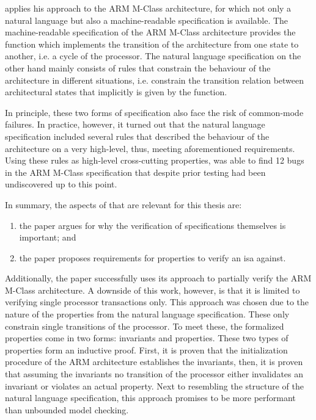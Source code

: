 \citeauthor{Reid17} applies his approach to the ARM M-Class architecture, for which not only a natural language but also a machine-readable specification is available.
The machine-readable specification of the ARM M-Class architecture provides the function  which implements the transition of the architecture from one state to another, i.e. a cycle of the processor.
The natural language specification on the other hand mainly consists of rules that constrain the behaviour of the architecture in different situations, i.e. constrain the transition relation between architectural states that implicitly is given by the  function.

In principle, these two forms of specification also face the risk of common-mode failures.
In practice, however, it turned out that the natural language specification included several rules that described the behaviour of the architecture on a very high-level, thus, meeting aforementioned requirements.
Using these rules as high-level cross-cutting properties, \citeauthor{Reid17} was able to find 12 bugs in the ARM M-Class specification that despite prior testing had been undiscovered up to this point.

In summary, the aspects of \cite{Reid17} that are relevant for this thesis are:
\begin{enumerate}[label=\alph*)]
    \item the paper argues for why the verification of specifications themselves is important; and
    \item the paper proposes requirements for properties to verify an \gls{isa} against.
\end{enumerate}

Additionally, the paper successfully uses its approach to partially verify the ARM M-Class architecture.
A downside of this work, however, is that it is limited to verifying single processor transactions only.
This approach was chosen due to the nature of the properties from the natural language specification.
These only constrain single transitions of the processor.
To meet these, the formalized properties come in two forms: invariants and properties.
These two types of properties form an inductive proof.
First, it is proven that the initialization procedure of the ARM architecture establishes the invariants, then, it is proven that assuming the invariants no transition of the processor either invalidates an invariant or violates an actual property.
Next to resembling the structure of the natural language specification, this approach promises to be more performant than unbounded model checking.


